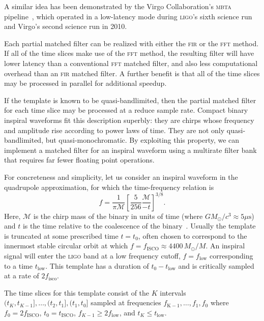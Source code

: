   A similar idea has been demonstrated by the Virgo Collaboration's \textsc{mbta} pipeline~\cite{Marion2004,beauville2006,beauville2008,Buskulic2010}, which operated in a low-latency mode during \textsc{ligo}'s sixth science run and Virgo's second science run in 2010.

Each partial matched filter can be realized with either the \textsc{fir} or the \textsc{fft} method.  If all of the time slices make use of the \textsc{fft} method, the resulting filter will have lower latency than a conventional \textsc{fft} matched filter, and also less computational overhead than an \textsc{fir} matched filter.  A further benefit is that all of the time slices may be processed in parallel for additional speedup.

If the template is known to be quasi-bandlimited, then the partial matched filter for each time slice may be processed at a reduce sample rate.  Compact binary inspiral waveforms fit this description superbly: they are chirps whose frequency and amplitude rise according to power laws of time.  They are not only quasi-bandlimited, but quasi-monochromatic.  By exploiting this property, we can implement a matched filter for an inspiral waveform using a multirate filter bank that requires far fewer floating point operations.

For concreteness and simplicity, let us consider an inspiral waveform in the quadrupole approximation, for which the time-frequency relation is
\begin{equation}
\label{eq:fgw}
f = \frac{1}{\mathcal{\pi M}} \left[ \frac{5}{256}\frac{\mathcal{M}}{-t} \right]^{3/8}.
\end{equation}
Here, $\mathcal{M}$ is the chirp mass of the binary in units of time (where $G M_\odot / c^3 \approx 5 \mu\mathrm{s}$) and $t$ is the time relative to the coalescence of the binary~\cite{findchirppaper, kidder1992, blanchet2002, hanna2009}.  Usually the template is truncated at some prescribed time $t = t_0$, often chosen to correspond to the innermost stable circular orbit at which $f = f_\mathrm{ISCO} \approx 4400 \, M_\odot / M$.  An inspiral signal will enter the \textsc{ligo} band at a low frequency cutoff, $f = f_\mathrm{low}$ corresponding to a time $t_\mathrm{low}$.  This template has a duration of $t_\mathrm{0} - t_\mathrm{low}$ and is critically sampled at a rate of $2 f_\mathrm{isco}$.

The time slices for this template consist of the $K$ intervals $(t_K, t_{K-1}], \dots, (t_2, t_1], (t_1, t_0]$ sampled at frequencies $f_\mathrm{K-1}, \dots, f_1, f_0$ where $f_0 = 2 f_\mathrm{ISCO}$, $t_0 = t_\mathrm{ISCO}$, $f_{K-1} \geqslant 2 f_\mathrm{low}$, and $t_K \leqslant t_\mathrm{low}$.

